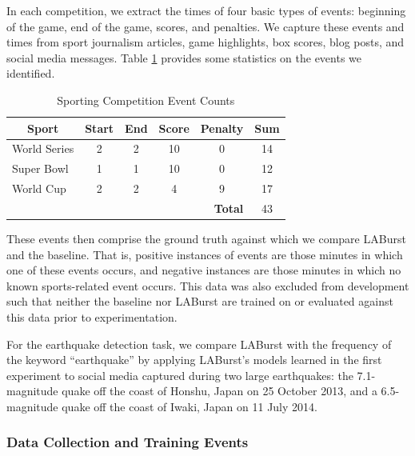 \documentclass{sig-alternate}
\newcommand{\red}[1]{\textcolor{red}{#1}}
\begin{document}
In each competition, we extract the times of four basic types of events: beginning of the game, end of the game, scores, and penalties.
We capture these events and times from sport journalism articles, game highlights, box scores, blog posts, and social media messages.
Table \ref{tab:eventStats} provides some statistics on the events we identified.
%
\begin{table}[htdp]
\caption{Sporting Competition Event Counts}
\begin{center}
\begin{tabular}{|p{0.7in}|c|c|c|c|c|}
\hline
\multicolumn{1}{|c|}{\textbf{Sport}} & \textbf{Start} & \textbf{End} & \textbf{Score} & \textbf{Penalty} & \textbf{Sum} \\ \hline
World Series & 2 & 2 & 10 & 0 & 14 \\ \hline
Super Bowl & 1 & 1 & 10 & 0 & 12 \\ \hline
World Cup & 2 & 2 & 4 & 9 & 17 \\ \hline
\multicolumn{5}{|r|}{\textbf{Total}} & 43 \\ \hline
\end{tabular}
\end{center}
\label{tab:eventStats}
\end{table}


These events then comprise the ground truth against which we compare LABurst and the baseline.
That is, positive instances of events are those minutes in which one of these events occurs, and negative instances are those minutes in which no known sports-related event occurs.
This data was also excluded from development such that neither the baseline nor LABurst are trained on or evaluated against this data prior to experimentation.

For the earthquake detection task, we compare LABurst with the frequency of the keyword ``earthquake'' by applying LABurst's models learned in the first experiment to social media captured during two large earthquakes: the 7.1-magnitude quake off the coast of Honshu, Japan on 25 October 2013, and a 6.5-magnitude quake off the coast of Iwaki, Japan on 11 July 2014.

\subsubsection{Data Collection and Training Events}
\end{document}
